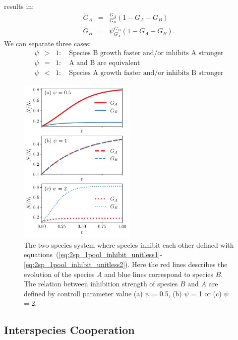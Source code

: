 \documentclass[10pt,A4paper]{article}
\begin{document}
results in: 
\begin{eqnarray}
\dot{G}_A &=&\frac{G_A}{G_B}\left(1 - G_A-G_B\right )
\label{eq:2sp_1pool_inhibit_unitless1}\\
\dot{G}_B &=&\psi\frac{G_B}{G_A}\left(1-G_A-G_B\right ). 
\label{eq:2sp_1pool_inhibit_unitless2}
\end{eqnarray}
We can separate three cases: 
\begin{eqnarray}
\psi&>&1:\quad\text{Species B growth faster and/or inhibits A stronger}\\
\psi&=&1:\quad\text{A and B are equivalent}\\
\psi&<&1:\quad\text{Species A growth faster and/or inhibits B stronger}
\end{eqnarray}


\begin{figure}[H]
    \begin{center}
    \includegraphics[width=0.5\textwidth]{Figures/pool_model_1pool_inhib.pdf}
    \caption{{\footnotesize The two species system where species inhibit each other defined with equations~(\ref{eq:2sp_1pool_inhibit_unitless1}-\ref{eq:2sp_1pool_inhibit_unitless2}).
    Here the red lines describes the evolution of the species $A$ and blue lines correspond to species $B$.
    The relation between inhibition strength of spesies $B$ and $A$ are defined by controll parameter value (a) $\psi$ = 0.5, (b) $\psi$ = 1 or (c) $\psi$ = 2.}}
    \label{fig:1pool_2sp_inhibit}
    \end{center}
\end{figure}



\subsection{Interspecies Cooperation}
\end{document}
